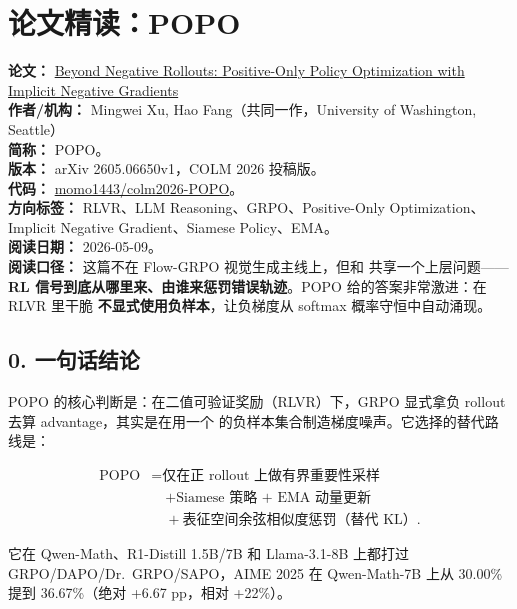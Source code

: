 
\section{论文精读：POPO}

\begin{conceptbox}
\textbf{论文：} \href{https://arxiv.org/abs/2605.06650}{Beyond Negative Rollouts: Positive-Only Policy Optimization with Implicit Negative Gradients}\\
\textbf{作者/机构：} Mingwei Xu, Hao Fang（共同一作，University of Washington, Seattle）\\
\textbf{简称：} POPO。\\
\textbf{版本：} arXiv 2605.06650v1，COLM 2026 投稿版。\\
\textbf{代码：} \href{https://github.com/momo1443/colm2026-POPO}{momo1443/colm2026-POPO}。\\
\textbf{方向标签：} RLVR、LLM Reasoning、GRPO、Positive-Only Optimization、Implicit Negative Gradient、Siamese Policy、EMA。\\
\textbf{阅读日期：} 2026-05-09。\\
\textbf{阅读口径：} 这篇不在 Flow-GRPO 视觉生成主线上，但和  共享一个上层问题——\textbf{RL 信号到底从哪里来、由谁来惩罚错误轨迹}。POPO 给的答案非常激进：在 RLVR 里干脆 \textbf{不显式使用负样本}，让负梯度从 softmax 概率守恒中自动涌现。
\end{conceptbox}

\subsection{0. 一句话结论}

POPO 的核心判断是：在二值可验证奖励（RLVR）下，GRPO 显式拿负 rollout 去算 advantage，其实是在用一个  的负样本集合制造梯度噪声。它选择的替代路线是：

\[
\begin{aligned}
\text{POPO}
&= \text{仅在正 rollout 上做有界重要性采样}\\
&\quad + \text{Siamese 策略 + EMA 动量更新}\\
&\quad + \text{表征空间余弦相似度惩罚（替代 KL）}.
\end{aligned}
\]

它在 Qwen-Math、R1-Distill 1.5B/7B 和 Llama-3.1-8B 上都打过 GRPO/DAPO/Dr.~GRPO/SAPO，AIME 2025 在 Qwen-Math-7B 上从 30.00\% 提到 36.67\%（绝对 +6.67 pp，相对 +22\%）。

